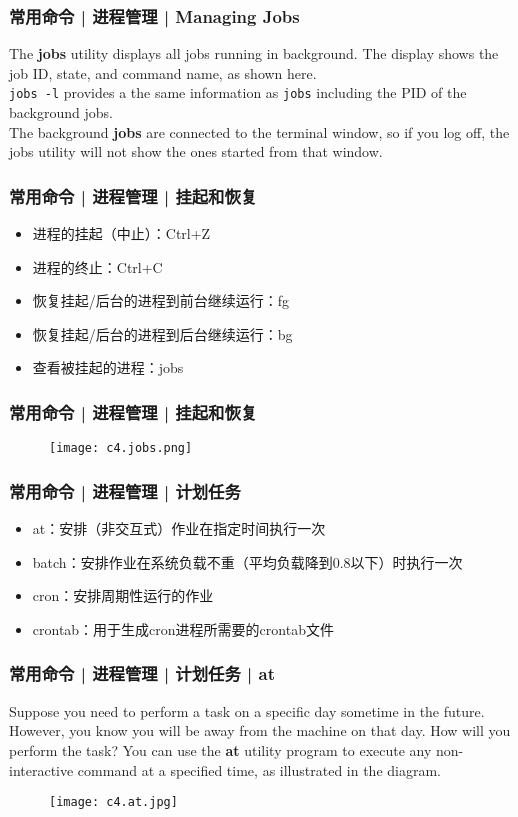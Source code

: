 \begin{frame}[fragile]
  \frametitle{常用命令 | 进程管理 | Managing Jobs}
  The \textbf{jobs} utility displays all jobs running in background. The display shows the job ID, state, and command name, as shown here.\\
  \vspace{0.2cm}
  \verb|jobs -l| provides a the same information as \verb|jobs| including the PID of the background jobs.\\
  \vspace{0.2cm}
  The background \textbf{jobs} are connected to the terminal window, so if you log off, the jobs utility will not show the ones started from that window.
\end{frame}

\begin{frame}
  \frametitle{常用命令 | 进程管理 | \alert{挂起和恢复}}
  \begin{itemize}
    \item 进程的挂起（中止）：Ctrl+Z
    \item 进程的终止：Ctrl+C
    \item 恢复挂起/后台的进程到前台继续运行：fg
    \item 恢复挂起/后台的进程到后台继续运行：bg
    \item 查看被挂起的进程：jobs
  \end{itemize}
\end{frame}

\begin{frame}
  \frametitle{常用命令 | 进程管理 | 挂起和恢复}
  \begin{figure}
    \centering
    \texttt{[image: c4.jobs.png]}
  \end{figure}
\end{frame}

\begin{frame}
  \frametitle{常用命令 | 进程管理 | \alert{计划任务}}
  \begin{itemize}
    \item at：安排（非交互式）作业在指定时间执行一次
    \item batch：安排作业在系统负载不重（平均负载降到0.8以下）时执行一次
    \item cron：安排周期性运行的作业
    \item crontab：用于生成cron进程所需要的crontab文件
  \end{itemize}
\end{frame}

\begin{frame}
  \frametitle{常用命令 | 进程管理 | 计划任务 | at}
  Suppose you need to perform a task on a specific day sometime in the future. However, you know you will be away from the machine on that day. How will you perform the task? You can use the \textbf{at} utility program to execute any non-interactive command at a specified time, as illustrated in the diagram.
  \begin{figure}
    \centering
    \texttt{[image: c4.at.jpg]}
  \end{figure}
\end{frame}

